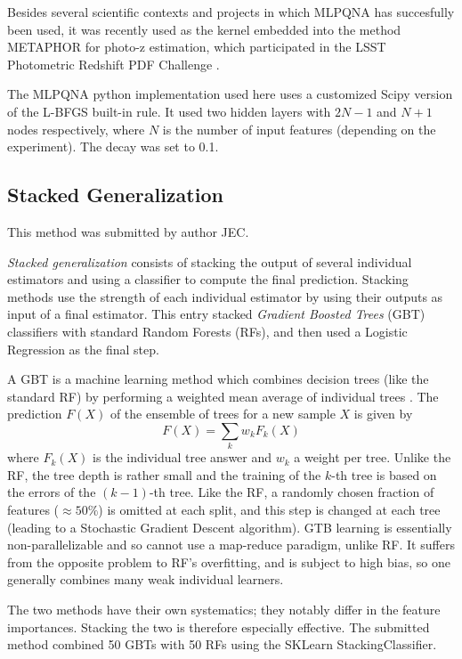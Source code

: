 \documentclass[twocolumn,twocolappendix]{aastex63}
\begin{document}
Besides several scientific contexts and projects in which MLPQNA has succesfully
been used, it was recently used as the kernel embedded into the method {\sc
METAPHOR} \citep{cavuoti20} for photo-z estimation, which participated in the
LSST Photometric Redshift PDF Challenge \citep{schmidt20}. 

The {\sc MLPQNA} python implementation used here
uses a customized Scipy version of the L-BFGS built-in rule.
It used two hidden layers with $2N-1$ and $N+1$ nodes respectively,
where $N$ is the number of input features (depending on the experiment).
The decay was set to 0.1.


\subsection{ {\sc Stacked Generalization} } \label{sec:stackgen}
This method was submitted by author JEC.

\emph{Stacked generalization} consists of stacking the output of several individual estimators and 
using a classifier to compute the final prediction. Stacking methods use the strength of each 
individual estimator by using their outputs as input of a final estimator.  This entry stacked
\emph{Gradient Boosted Trees} (GBT) classifiers with standard Random Forests (RFs), and then used a Logistic 
Regression as the final step.

A GBT is a machine learning method which combines decision trees (like the standard RF)
by performing a weighted mean average of individual trees \citep{Friedman:2002we,RefWorks:1634}. 
The prediction $F(X)$ of the ensemble of trees for a new sample $X$ is given by
\begin{equation}
F(X) = \sum_k w_k F_k(X)
\end{equation}
where $F_k(X)$ is the individual tree answer and $w_k$ a weight per tree. Unlike the RF, the 
tree depth is rather small and the training  of the $k$-th tree is based on the errors of the
$(k-1)$-th tree.  Like the RF, a randomly chosen fraction of features ($\approx 50\%$) is 
omitted at each split, and this step is changed at each tree (leading to a Stochastic Gradient Descent 
algorithm).  GTB learning is essentially non-parallelizable and so cannot use a map-reduce paradigm, 
unlike RF. It suffers from the opposite problem to RF's overfitting, and is subject
to high bias, so one generally combines many weak individual learners.

The two methods have their own systematics; they notably differ in the feature importances. Stacking 
the two is therefore especially effective.  The submitted method combined 50 GBTs with
50 RFs using the {\sc SKLearn} {\sc StackingClassifier}.
\end{document}
